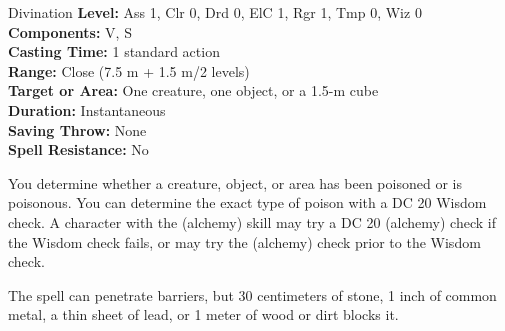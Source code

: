 {Divination}
{
	\textbf{Level:}
	Ass 1, Clr 0, Drd 0, ElC 1, Rgr 1, Tmp 0, Wiz 0\\
	\textbf{Components:}
	V, S\\
	\textbf{Casting Time:}
	1 standard action\\
	\textbf{Range:}
	Close (7.5 m + 1.5 m/2 levels)\\
	\textbf{Target or Area:}
	One creature, one object, or a 1.5-m cube\\
	\textbf{Duration:}
	Instantaneous\\
	\textbf{Saving Throw:}
	None\\
	\textbf{Spell Resistance:}
	No\\
}
{
	You determine whether a creature, object, or area has been poisoned or is poisonous. You can determine the exact type of poison with a DC 20 Wisdom check. A character with the  (alchemy) skill may try a DC 20  (alchemy) check if the Wisdom check fails, or may try the  (alchemy) check prior to the Wisdom check.

	The spell can penetrate barriers, but 30 centimeters of stone, 1 inch of common metal, a thin sheet of lead, or 1 meter of wood or dirt blocks it.

}
